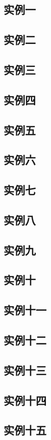 \documentclass[a4paper]{article}
\begin{document}
\subsection{实例一}
\subsection{实例二}
\subsection{实例三}
\subsection{实例四}
\subsection{实例五}
\subsection{实例六}
\subsection{实例七}
\subsection{实例八}
\subsection{实例九}
\subsection{实例十}
\subsection{实例十一}
\subsection{实例十二}
\subsection{实例十三}
\subsection{实例十四}
\subsection{实例十五}
\end{document}
